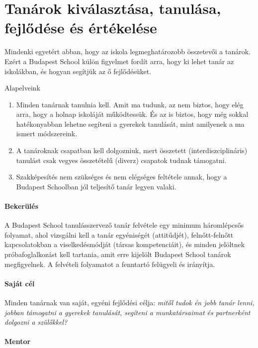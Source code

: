 \section{Tanárok kiválasztása, tanulása, fejlődése és értékelése}

Mindenki egyetért abban, hogy az iskola legmeghatározobb összetevői a tanárok. Ezért a Budapest School külön figyelmet fordít arra, hogy ki lehet tanár az iskolákban, és hogyan segítjük az ő fejlődésüket.

Alapelveink
\begin{enumerate}
\item Minden tanárnak tanulnia kell. Amit ma tudunk, az nem biztos, hogy elég arra, hogy a holnap iskoláját működtessük. És az is biztos, hogy még sokkal hatékonyabban lehetne segíteni a gyerekek tanulását, mint amilyenek a ma ismert módszereink.

\item A tanároknak csapatban kell dolgozniuk, mert összetett (interdiszciplináris) tanulást csak vegyes összetételű (diverz) csapatok tudnak támogatni.

\item Szakképesítés nem szükséges és nem elégséges feltétele annak, hogy a Budapest Schoolban jól teljesítő tanár legyen valaki.
\end{enumerate}

\paragraph{Bekerülés}
A Budapest School tanulásszervező tanár felvétele egy minimum háromlépcsős folyamat, ahol vizsgálni kell a tanár egyéniségét (attitűdjét), felnőtt-felnőtt kapcsolatokban a viselkedésmódját (társas kompetenciáit), és minden jelöltnek próbafoglalkozást kell tartania, amit erre kijelölt Budapest School tanárok megfigyelnek. A felvételi folyamatot a fenntartó felügyeli és irányítja.

\paragraph{Saját cél}

Minden tanárnak van saját, egyéni fejlődési célja: \emph{mitől tudok én jobb tanár lenni, jobban támogatni a gyerekek tanulását, segíteni a munkatársaimat és partnerként dolgozni a szülőkkel?}

\paragraph{Mentor}

